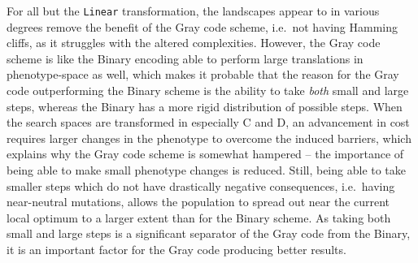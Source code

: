 \documentclass[a4paper,12pt]{article}
\theoremstyle{plain}
\theoremstyle{definition}
\begin{document}
      For all but the \texttt{Linear} transformation, the landscapes appear to in
      various degrees remove the benefit of the Gray code scheme, i.e.\ not
      having Hamming cliffs,
      as it struggles with the altered complexities. However, the Gray code scheme is like
      the Binary encoding able to perform large translations in phenotype-space
      as well, which makes it probable that the reason for the Gray code 
      outperforming the Binary scheme is the ability to take \textit{both} small
      and large steps, whereas the Binary has a more rigid distribution of possible
      steps. When the search spaces are transformed in especially
      C and D, an advancement in cost requires
      larger changes in the phenotype to overcome the induced barriers, which
      explains why the Gray code scheme is somewhat hampered -- the
      importance of being able to make small phenotype changes is reduced. 
      Still, being able to take smaller steps which do not have
      drastically negative consequences, i.e.\ having near-neutral mutations, allows the
      population to spread out near the current local optimum to a larger extent
      than for the Binary scheme. As taking both small and
      large steps is a significant separator of the Gray code from the Binary,
      it is an important factor for the Gray code producing better results.  
      
\end{document}
